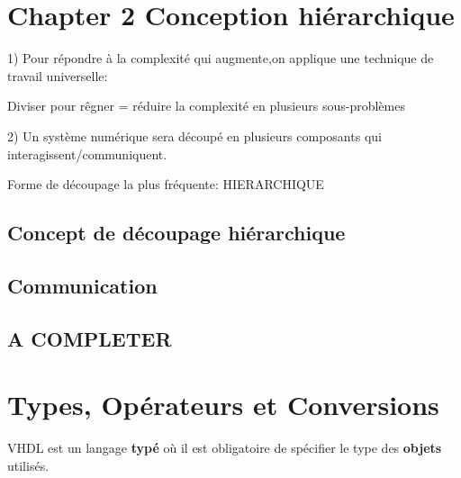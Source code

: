 \newpage
\section{Chapter 2 Conception hiérarchique}
\begin{cisco}
1) Pour répondre à la complexité qui augmente,on applique une technique de travail universelle:

Diviser pour rêgner = réduire la complexité en plusieurs sous-problèmes

2) Un système numérique sera découpé en plusieurs composants qui interagissent/communiquent.

Forme de découpage la plus fréquente: HIERARCHIQUE
\end{cisco}

\subsection{Concept de découpage hiérarchique}
 
\subsection{Communication}
 
 
 \subsection{A COMPLETER}
 
 







\newpage
\section{Types, Opérateurs et Conversions}



VHDL est un langage \textbf{typé} où il est obligatoire de spécifier le type des \textbf{objets} utilisés.






























